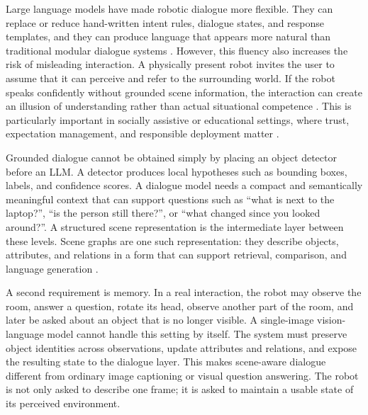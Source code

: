 Large language models have made robotic dialogue more flexible. They can replace or reduce hand-written intent rules, dialogue states, and response templates, and they can produce language that appears more natural than traditional modular dialogue systems \cite{atuhurra_leveraging_2024}. However, this fluency also increases the risk of misleading interaction. A physically present robot invites the user to assume that it can perceive and refer to the surrounding world. If the robot speaks confidently without grounded scene information, the interaction can create an illusion of understanding rather than actual situational competence \cite{kim_understanding_2024}. This is particularly important in socially assistive or educational settings, where trust, expectation management, and responsible deployment matter \cite{atuhurra_leveraging_2024}.

Grounded dialogue cannot be obtained simply by placing an object detector before an LLM. A detector produces local hypotheses such as bounding boxes, labels, and confidence scores. A dialogue model needs a compact and semantically meaningful context that can support questions such as \enquote{what is next to the laptop?}, \enquote{is the person still there?}, or \enquote{what changed since you looked around?}. A structured scene representation is the intermediate layer between these levels. Scene graphs are one such representation: they describe objects, attributes, and relations in a form that can support retrieval, comparison, and language generation \cite{johnson_image_2015}.

A second requirement is memory. In a real interaction, the robot may observe the room, answer a question, rotate its head, observe another part of the room, and later be asked about an object that is no longer visible. A single-image vision-language model cannot handle this setting by itself. The system must preserve object identities across observations, update attributes and relations, and expose the resulting state to the dialogue layer. This makes scene-aware dialogue different from ordinary image captioning or visual question answering. The robot is not only asked to describe one frame; it is asked to maintain a usable state of its perceived environment.

